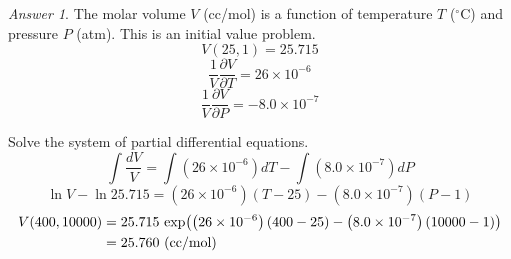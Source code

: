 \documentclass[a4paper, 12pt]{article}
\newcommand{\Left}{\mathopen{}\mathclose\bgroup\left}
\newcommand{\Right}{\aftergroup\egroup\right}
\theoremstyle{definition}
\theoremstyle{remark}
\newtheorem*{answer}{Answer}
\begin{document}
\begin{answer}
    The molar volume $V$ (cc/mol) is a function of temperature $T$ ($^\circ$C)
    and pressure $P$ (atm).  This is an initial value problem.
    \[ V(25, 1) = 25.715 \]
    \[ \frac1V \frac{\partial V}{\partial T} = 26 \times 10^{-6} \]
    \[ \frac1V \frac{\partial V}{\partial P} = -8.0 \times 10^{-7} \]

    Solve the system of partial differential equations.
    \[
        \int \frac{dV}{V} =
            \int \left( 26 \times 10^{-6} \right) dT 
            - \int \left( 8.0 \times 10^{-7} \right) dP
    \]
    \[
        \ln V - \ln 25.715 =
            \left( 26 \times 10^{-6}  \right) \left( T - 25 \right)
            - \left( 8.0 \times 10^{-7} \right) \left( P - 1 \right)
    \]
    \begin{align*}
        V(400, 10000) &= 25.715 \, \exp \Left(
            \left( 26 \times 10^{-6}  \right) \left( 400 - 25 \right)
            - \left( 8.0 \times 10^{-7} \right) \left( 10000 - 1 \right) \Right) \\
            &= 25.760 \text{ (cc/mol)}
    \end{align*}
\end{answer}
\end{document}
